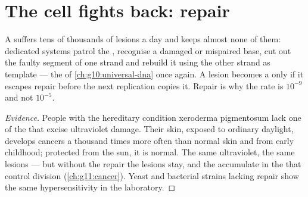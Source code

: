 \section{The cell fights back: repair}

\begin{proposition}\label{prop:g11:mutations:repair}
A  suffers tens of thousands of  lesions a day and keeps almost
none of them: dedicated  systems patrol the ,
recognise a damaged or mispaired base, cut out the faulty segment of
one strand and rebuild it using the other strand as template --- the
 of \cref{ch:g10:universal-dna} once again. A lesion
becomes a  only if it escapes repair before the next
replication copies it. Repair is why the  rate is $10^{-9}$
and not $10^{-5}$.
\end{proposition}
\begin{proof}[Evidence]
People with the hereditary condition xeroderma pigmentosum lack one of
the  that excise ultraviolet damage. Their skin, exposed to
ordinary daylight, develops cancers a thousand times more often than
normal skin and from early childhood; protected from the sun, it is
normal. The same ultraviolet, the same lesions --- but without the
repair the lesions stay, and the  accumulate in the 
that control  division (\cref{ch:g11:cancer}). Yeast and bacterial
strains lacking repair  show the same hypersensitivity in the
laboratory.
\end{proof}

